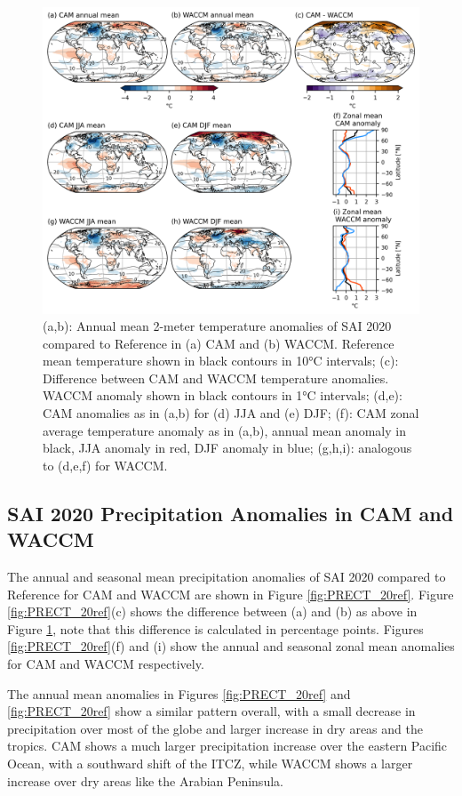 \begin{figure}[H]
	\centering
	\includegraphics[width=0.95\linewidth]{images/TREFHT_20ref.png}
	\caption{(a,b): Annual mean 2-meter temperature anomalies of SAI 2020 compared to Reference in (a) CAM and (b) WACCM. Reference mean temperature shown in black contours in 10°C intervals; (c): Difference between CAM and WACCM temperature anomalies. WACCM anomaly shown in black contours in 1°C intervals; (d,e): CAM anomalies as in (a,b) for (d) JJA and (e) DJF; (f): CAM zonal average temperature anomaly as in (a,b), annual mean anomaly in black, JJA anomaly in red, DJF anomaly in blue; (g,h,i): analogous to (d,e,f) for WACCM.}
	\label{fig:TREFHT_20ref}
\end{figure}


\subsection{SAI 2020 Precipitation Anomalies in CAM and WACCM}
The annual and seasonal mean precipitation anomalies of SAI 2020 compared to Reference for CAM and WACCM are shown in Figure \ref{fig:PRECT_20ref}. Figure \ref{fig:PRECT_20ref}(c) shows the difference between (a) and (b) as above in Figure \ref{fig:TREFHT_20ref}, note that this difference is calculated in percentage points. Figures \ref{fig:PRECT_20ref}(f) and (i) show the annual and seasonal zonal mean anomalies for CAM and WACCM respectively. 

The annual mean anomalies in Figures \ref{fig:PRECT_20ref} and \ref{fig:PRECT_20ref} show a similar pattern overall, with a small decrease in precipitation over most of the globe and larger increase in dry areas and the tropics. CAM shows a much larger precipitation increase over the eastern Pacific Ocean, with a southward shift of the ITCZ, while WACCM shows a larger increase over dry areas like the Arabian Peninsula. 

